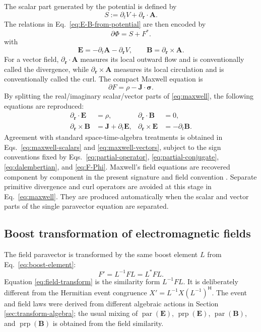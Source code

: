 \documentclass[10pt,letterpaper]{article}
\newcommand{\eqfunc}[1]{\operatorname{#1}}
\newcommand{\pv}[1]{#1}
\newcommand{\vct}[1]{\mathbf{#1}}
\newcommand{\sigv}{\vct{\pv{\bm{\sigma}}}}
\newcommand{\delop}{\partial}
\newcommand{\delr}{\delop_{\vct{r}}}
\newcommand{\gradv}{\delr}
\newcommand{\Hop}{\mathsf H}
\newcommand{\conj}[1]{#1^{*}}
\begin{document}
The scalar part generated by the potential is defined by
\begin{equation}
S:=\partial_t V+\gradv\cdot\vct{A}.
\label{eq:potential-scalar}
\end{equation}
The relations in Eq.\ \eqref{eq:E-B-from-potential} are then encoded by
\begin{equation}
\pv{\partial}\pv{\Phi}=S+\conj{\pv{F}}.
\label{eq:potential-gradient}
\end{equation}
with
\begin{equation}
\vct{E}=-\partial_t\vct{A}-\gradv V,
\qquad
\vct{B}=\gradv\times\vct{A}.
\label{eq:E-B-from-potential}
\end{equation}
For a vector field, \(\gradv\cdot\vct{A}\) measures its local outward
flow and is conventionally called the divergence, while
\(\gradv\times\vct{A}\) measures its local circulation and is conventionally
called the curl.
The compact Maxwell equation is
\begin{equation}
\pv{\partial}\pv{F}=\rho-\vct{J}\cdot\sigv.
\label{eq:maxwell}
\end{equation}
By splitting the real/imaginary scalar/vector parts of \eqref{eq:maxwell}, the following equations are reproduced:
\begin{align}
\gradv\cdot\vct{E}&=\rho,
&
\gradv\cdot\vct{B}&=0,
\label{eq:maxwell-scalars}\\
\gradv\times\vct{B}&=\vct{J}+\partial_t\vct{E},
&
\gradv\times\vct{E}&=-\partial_t\vct{B}.
\label{eq:maxwell-vectors}
\end{align}
Agreement with standard space-time-algebra treatments is obtained in Eqs.\ \eqref{eq:maxwell-scalars} and \eqref{eq:maxwell-vectors}, subject to the sign conventions fixed by Eqs.\ \eqref{eq:partial-operator}, \eqref{eq:partial-conjugate}, \eqref{eq:dalembertian}, and \eqref{eq:F-Phi}. Maxwell's field equations are recovered component by component in the present signature and field convention \cite{maxwell1865,hestenes1966,baylis1999,jackson1998}.
Separate primitive divergence and curl operators are avoided at this stage in Eq.\ \eqref{eq:maxwell}. They are produced automatically when the scalar and vector parts of the single paravector equation are separated.

\subsection{Boost transformation of electromagnetic fields}
The field paravector is transformed by the same boost element \(\pv{L}\) from Eq.\ \eqref{eq:boost-element}:
\begin{equation}
\pv{F}'=\pv{L}^{-1}\pv{F}\pv{L}
=\conj{\pv{L}}\pv{F}\pv{L}.
\label{eq:field-transform}
\end{equation}
Equation \eqref{eq:field-transform} is the similarity form
\(\pv{L}^{-1}\pv{F}\pv{L}\). It is deliberately different from the
Hermitian event congruence
\(\pv{X}'=\pv{L}^{-1}\pv{X}(\pv{L}^{-1})^{\Hop}\).
The event and field laws were derived from different algebraic actions in
Section \ref{sec:transform-algebra}; the usual mixing of
\(\eqfunc{par}(\vct{E})\), \(\eqfunc{prp}(\vct{E})\),
\(\eqfunc{par}(\vct{B})\), and \(\eqfunc{prp}(\vct{B})\) is obtained from
the field similarity.
\end{document}
